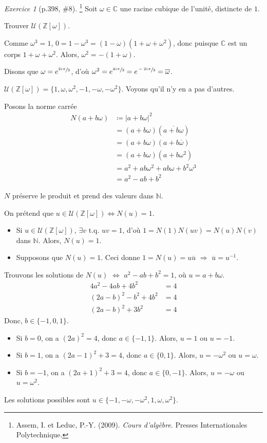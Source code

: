 \documentclass{report}
\theoremstyle{definition}
\theoremstyle{remark}
\newtheorem*{exer}{Exercice}
\def\NN{\mathbb{N}}
\def\ZZ{\mathbb{Z}}
\def\CC{\mathbb{C}}
\newcommand*{\abs}[1]{\left|#1\right|}
\begin{document}
	\begin{exer}[p.398, \#8]\footnote{Assem, I. et Leduc, P.-Y. (2009). \textit{Cours d'algèbre}. Presses Internationales Polytechnique.}
		Soit $\omega\in\CC$ une racine cubique de l'unit\'e, distincte de $1$.

		Trouver $\mathcal{U}(\ZZ[\omega])$.

		Comme $\omega^3=1$, $0=1-\omega^3=(1-\omega)(1+\omega+\omega^2)$, donc puisque $\CC$ est un corps $1+\omega+\omega^2$. Alors, $\omega^2=-(1+\omega)$.

		Disons que $\omega=e^{\sfrac{2i\pi}{3}}$, d'o\`u $\omega^2=e^{\sfrac{4i\pi}{3}} = e^{\sfrac{-2i\pi}{3}} = \overline{\omega}$.

		$\mathcal{U}(\ZZ[\omega]) = \{1, \omega ,\omega^2 ,-1 ,-\omega ,-\omega^2\}$. Voyons qu'il n'y en a pas d'autres.

		Posons la norme carr\'ee
		\begin{align*}
			N(a+b\omega)&\coloneq \abs{a+b\omega}^2\\
			&= (a+b\omega) (\overline{a+b\omega})\\
			&= (a+b\omega) (a+b\overline{\omega})\\
			&= (a+b\omega) (a+b\omega^2)\\
			&= a^2+ab\omega^2+ab\omega+b^2\omega^3\\
			&= a^2-ab+b^2
		\end{align*}

		$N$ pr\'eserve le produit et prend des valeurs dans $\NN$.

		On pr\'etend que $u\in\mathcal{U}(\ZZ[\omega]) \Longleftrightarrow N(u)=1$.
		\begin{itemize}
			\item Si $u\in\mathcal{U}(\ZZ[\omega])$, $\exists v$ t.q. $uv=1$, d'o\`u $1 = N(1) N(uv) = N(u)N(v)$ dans $\NN$. Alors, $N(u)=1$.
			\item Supposons que $N(u)=1$. Ceci donne $1 = N(u) = u \overline{u}$ $\Longrightarrow$ $\overline{u}=u^{-1}$.
		\end{itemize}

		Trouvons les solutions de $N(u)$ $\Longleftrightarrow$ $a^2-ab+b^2=1$, o\`u $u=a+b\omega$.
		\begin{align*}
			4a^2-4ab+4b^2&= 4\\
			(2a-b)^2-b^2+4b^2&= 4\\
			(2a-b)^2+3b^2&= 4
		\end{align*}
		Donc, $b\in\{-1,0,1\}$.
		\begin{itemize}
			\item Si $b=0$, on a $(2a)^2=4$, donc $a\in\{-1,1\}$. Alors, $u=1$ ou $u=-1$.
			\item Si $b=1$, on a $(2a-1)^2+3=4$, donc $a\in\{0,1\}$. Alors, $u=-\omega^2$ ou $u=\omega$.
			\item Si $b=-1$, on a $(2a+1)^2+3=4$, donc $a\in\{0,-1\}$. Alors, $u=-\omega$ ou $u=\omega^2$.
		\end{itemize}

		Les solutions possibles sont $u\in\{-1, -\omega, -\omega^2, 1, \omega, \omega^2\}$.
	\end{exer}
\end{document}
